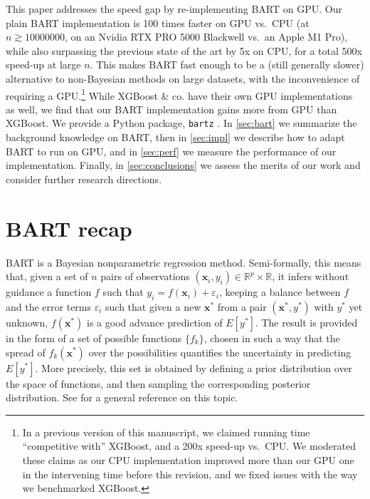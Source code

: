 \documentclass{article}
\newcommand{\redactedcite}[1]{#1}
\begin{document}
This paper addresses the speed gap by re-implementing BART on GPU.
Our plain BART implementation is 100 times faster on GPU
vs.\ CPU (at $n \gtrsim \num{10000000}$, on an Nvidia RTX PRO 5000 Blackwell vs.\
an Apple M1 Pro), while also surpassing the previous state of the art
\autocite{dorie2024} by 5x on CPU, for a total 500x speed-up at large $n$. This
makes BART fast enough to be a (still generally slower) alternative to
non-Bayesian methods on large datasets,
with the inconvenience of requiring a GPU.\footnote{In a previous
	version of this manuscript, we claimed running time ``competitive with''
XGBoost, and a 200x speed-up vs.\ CPU. We moderated these claims as our CPU implementation improved more than our GPU one in the intervening time before this revision, and we fixed issues with the way we benchmarked XGBoost.}
While XGBoost
\& co.{} have their own GPU implementations as well, we find that our BART implementation gains more from GPU than XGBoost.
We provide a Python package,
\texttt{bartz} \redactedcite{\citep{gattocrucco_2026_23932737}}. In
\autoref{sec:bart} we summarize the background knowledge on BART, then in
\autoref{sec:impl} we describe how to adapt BART to run on GPU, and in
\autoref{sec:perf} we measure the performance of our implementation. Finally,
in \autoref{sec:conclusions} we assess the merits of our work and consider
further research directions.

\section{BART recap}
\label{sec:bart}

BART is a Bayesian nonparametric regression method. Semi-formally, this means
that, given a set of $n$ pairs of observations $(\mathbf x_i,y_i) \in \mathbb
R^p \times \mathbb R$, it infers without guidance a function $f$ such that $y_i
= f(\mathbf x_i) + \varepsilon_i$, keeping a balance between $f$ and the error
terms $\varepsilon_i$ such that given a new $\mathbf x^*$ from a pair $(\mathbf
x^*, y^*)$ with $y^*$ yet unknown, $f(\mathbf x^*)$ is a good advance
prediction of $E[y^*]$. The result is provided in the form of a set of possible
functions $\{f_k\}$, chosen in such a way that the spread of $f_k(\mathbf x^*)$
over the possibilities quantifies the uncertainty in predicting $E[y^*]$. More
precisely, this set is obtained by defining a prior distribution over the
space of functions, and then sampling the corresponding posterior distribution.
See \citet[ch.~4]{muller2015} for a general reference on this topic.
\end{document}

